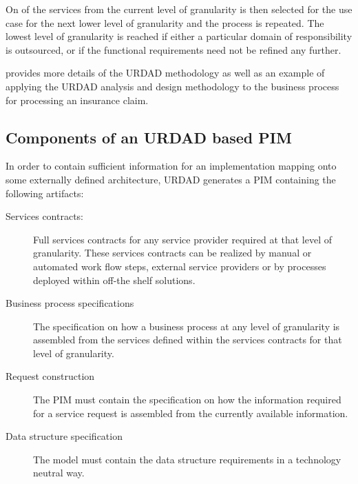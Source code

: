 \documentclass{llncs}
\begin{document}
On of the services from the current level of granularity is then selected for the use case for the next lower level of granularity and the process is repeated.
The lowest level of granularity is reached if either a particular domain
of responsibility is outsourced, or if the functional requirements need not be
refined any further.

\cite{Solms2007_TechnologyNeutralDesignViaUrdad} provides more details of the URDAD methodology as well as an example of applying the URDAD analysis and design methodology to the business process for processing an insurance claim.


\subsection{Components of an URDAD based PIM}

In order to contain sufficient information for an implementation mapping onto
some externally defined architecture, 
URDAD generates a PIM containing the following artifacts:
\begin{description}
  \item[Services contracts:] Full services contracts for any service provider required at that level of granularity. These services contracts can be realized by manual or automated work flow steps, external service providers or by processes deployed within off-the shelf solutions.

  \item[Business process specifications] The specification on how a business
	process at any level of granularity is assembled from the services
	defined within the services contracts for that level of granularity.	

  \item[Request construction] The PIM must contain the specification on
	how the information required for a service request is assembled
	from the currently available information.

  \item[Data structure specification] The model must contain the data structure
	requirements in a technology neutral way.
\end{description}


\end{document}
